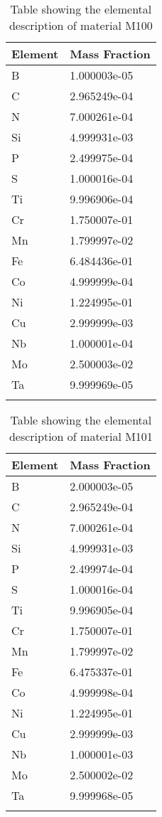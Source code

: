 \begin{centering}
\begin{longtable}[ht!]
{ p{} | p{} }
\hline
Element & Mass Fraction\\
\hline
B &  1.000003e-05\\
C &  2.965249e-04\\
N &  7.000261e-04\\
Si &  4.999931e-03\\
P &  2.499975e-04\\
S &  1.000016e-04\\
Ti &  9.996906e-04\\
Cr &  1.750007e-01\\
Mn &  1.799997e-02\\
Fe &  6.484436e-01\\
Co &  4.999999e-04\\
Ni &  1.224995e-01\\
Cu &  2.999999e-03\\
Nb &  1.000001e-04\\
Mo &  2.500003e-02\\
Ta &  9.999969e-05\\
\caption{Table showing the elemental description of material M100}
\label{table:material_M100}
\end{longtable}
\clearpage
\begin{longtable}[ht!]
{ p{} | p{} }
\hline
Element & Mass Fraction\\
\hline
B &  2.000003e-05\\
C &  2.965249e-04\\
N &  7.000261e-04\\
Si &  4.999931e-03\\
P &  2.499974e-04\\
S &  1.000016e-04\\
Ti &  9.996905e-04\\
Cr &  1.750007e-01\\
Mn &  1.799997e-02\\
Fe &  6.475337e-01\\
Co &  4.999998e-04\\
Ni &  1.224995e-01\\
Cu &  2.999999e-03\\
Nb &  1.000001e-03\\
Mo &  2.500002e-02\\
Ta &  9.999968e-05\\
\caption{Table showing the elemental description of material M101}
\label{table:material_M101}
\end{longtable}

\end{centering}
